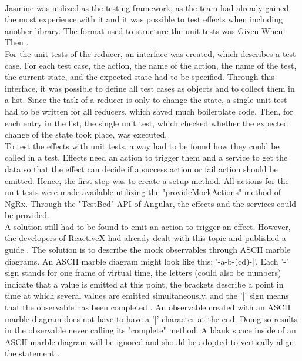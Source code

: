 \documentclass[Bachelor,BIF,english]{twbook}
\begin{document}
\\[\baselineskip]
Jasmine \cite{Jasmine} was utilized as the testing framework, as the team had already gained the most experience with it and it was possible to test effects when including another library. The format used to structure the unit tests was Given-When-Then \cite{GivenWhenThen}.
\\[\baselineskip]
For the unit tests of the reducer, an interface was created, which describes a test case. For each test case, the action, the name of the action, the name of the test, the current state, and the expected state had to be specified. Through this interface, it was possible to define all test cases as objects and to collect them in a list. Since the task of a reducer is only to change the state, a single unit test had to be written for all reducers, which saved much boilerplate code. Then, for each entry in the list, the single unit test, which checked whether the expected change of the state took place, was executed. 
\\[\baselineskip]
To test the effects with unit tests, a way had to be found how they could be called in a test. Effects need an action to trigger them and a service to get the data so that the effect can decide if a success action or fail action should be emitted. Hence, the first step was to create a setup method. All actions for the unit tests were made available utilizing the "provideMockActions" method of NgRx. Through the "TestBed" API of Angular, the effects and the services could be provided.
\\[\baselineskip]
A solution still had to be found to emit an action to trigger an effect. However, the developers of ReactiveX had already dealt with this topic and published a guide \cite{TestingMarbles}. The solution is to describe the mock observables through ASCII marble diagrams. An ASCII marble diagram might look like this: '-a-b-(cd)-|'. Each '-' sign stands for one frame of virtual time, the letters (could also be numbers) indicate that a value is emitted at this point, the brackets describe a point in time at which several values are emitted simultaneously, and the '|' sign means that the observable has been completed \cite{TestingMarblesSyntax}. An observable created with an ASCII marble diagram does not have to have a '|' character at the end. Doing so results in the observable never calling its "complete" method. A blank space inside of an ASCII marble diagram will be ignored and should be adopted to vertically align the statement \cite{TestingMarblesExamples} \cite{TestingMarblesSyntax}.
\end{document}
